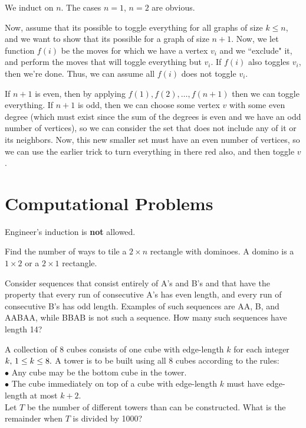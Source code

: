 \documentclass{article}
\newcommand{\skipline}{\vspace{2mm}}
\begin{document}
\begin{sol}
We induct on $n$. The cases $n=1$, $n=2$ are obvious.

Now, assume that its possible to toggle everything for all graphs of size $k\leq n$, and we want to show that its possible for a graph of size $n+1$. Now, we let function $f(i)$ be the moves for which we have a vertex $v_i$ and we ``exclude" it, and perform the moves that will toggle everything but $v_i$. If $f(i)$ also toggles $v_i$, then we're done. Thus, we can assume all $f(i)$ does not toggle $v_i$.

If $n+1$ is even, then by applying $f(1),f(2),\dots,f(n+1)$ then we can toggle everything. If $n+1$ is odd, then we can choose some vertex $v$ with some even degree (which must exist since the sum of the degrees is even and we have an odd number of vertices), so we can consider the set that does not include any of it or its neighbors. Now, this new smaller set must have an even number of vertices, so we can use the earlier trick to turn everything in there red also, and then toggle $v$.

\end{sol}

\newpage
\section{Computational Problems}
Engineer's induction is \textbf{not} allowed.

\skipline

\begin{prob}[Classic]{1}
Find the number of ways to tile a $2\times n$ rectangle with dominoes. A domino is a $1\times 2$ or a $2 \times 1$ rectangle.
\end{prob}

\begin{prob}[AIME 2008]{4}
Consider sequences that consist entirely of A's and B's and that have the property that every run of consecutive A's has even length, and every run of consecutive B's has odd length. Examples of such sequences are AA, B, and AABAA, while BBAB is not such a sequence. How many such sequences have length 14?
\end{prob}

\begin{prob}[AIME 2006/11]{2}
A collection of 8 cubes consists of one cube with edge-length $k$ for each integer $k,\thinspace 1 \le k \le 8.$  A tower is to be built using all 8 cubes according to the rules:\\[1\baselineskip]$\bullet$ Any cube may be the bottom cube in the tower.\\[0\baselineskip]$\bullet$ The cube immediately on top of a cube with edge-length $k$ must have edge-length at most $k+2.$\\[1\baselineskip]Let $T$ be the number of different towers than can be constructed.  What is the remainder when $T$ is divided by 1000?
\end{prob}
\end{document}
